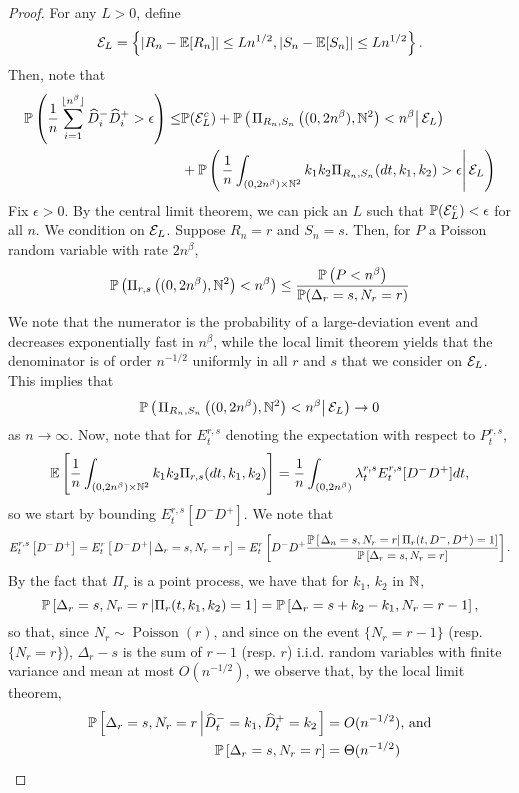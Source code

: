 \begin{proof}
For any $L>0$, define
$$\cE_L=\left\{|R_n-\E[R_n]|\leq Ln^{1/2},  |S_n-\E[S_n]|\leq Ln^{1/2}\right\}.$$
Then, note that 
\begin{align*}\P\left(\frac{1}{n}\sum_{i=1}^{\lfloor n^\beta\rfloor} \widehat{D}_i^-\widehat{D}_i^+>\epsilon \right)\leq & \P(\cE_L^c) + \P\left(\left.\Pi_{R_n,S_n}\left((0,2n^\beta),\N^2\right)<n^\beta\right|\cE_L \right)\\
&+\P\left(\left.\frac{1}{n}\int_{(0,2n^\beta)\times \N^2}k_1k_2 \Pi_{R_n,S_n}(dt,k_1,k_2)>\epsilon  \right|\cE_L \right)\end{align*}
Fix $\epsilon>0$. By the central limit theorem, we can pick an $L$ such that $\P(\cE_L^c)<\epsilon$ for all $n$. We condition on $\cE_L$. Suppose $R_n=r$ and $S_n=s$. Then, for $P$ a Poisson random variable with rate $2n^\beta$,
 $$\P\left(\Pi_{r,s}\left((0,2n^\beta),\N^2\right)<n^\beta\right)\leq \frac{\P\left(P<n^\beta\right)}{\P(\Delta_r=s, N_r=r)}$$
 We note that the numerator is the probability of a large-deviation event and decreases exponentially fast in $n^\beta$, while the local limit theorem yields that the denominator is of order $n^{-1/2}$ uniformly in all $r$ and $s$ that we consider on $\cE_L$. This implies that $$\P\left(\left.\Pi_{R_n,S_n}\left((0,2n^\beta),\N^2\right)<n^\beta\right|\cE_L\right)\to 0$$
as $n\to \infty$.  
Now, note that for $E^{r,s}_t$ denoting the expectation with respect to $P_t^{r,s}$,
$$\E\left[\frac{1}{n}\int_{(0,2n^\beta)\times \N^2}k_1k_2 \Pi_{r,s}(dt,k_1,k_2) \right]=\frac{1}{n}\int_{(0,2n^\beta)}\lambda^{r,s}_t E^{r,s}_t[D^- D^+]dt,$$
so we start by bounding $E^{r,s}_t[D^- D^+]$. 
We note that
$$E^{r,s}_t\left[{D}^-{D}^+\right]={E}^r_t\left[\left.{D}^-{D}^+\right| \Delta_r=s, N_r=r\right]={E}^r_t\left[{D}^-{D}^+\frac{\P\left[\left. \Delta_n=s, N_r=r \right|\Pi_r(t,D^-,D^+)=1\right]}{\P\left[ \Delta_r=s, N_r=r\right]}\right].$$
By the fact that $\Pi_r$ is a point process, we have that for $k_1$, $k_2$ in $\N$, 
$$\P\left[ \Delta_r=s, N_r=r \left| \Pi_r(t,k_1,k_2)=1\right.\right]=\P\left[ \Delta_r=s+k_2-k_1, N_r=r-1 \right],$$
so that, since $N_r\sim \operatorname{Poisson}(r)$, and since on the event $\{N_r=r-1\}$ (resp. $\{N_r=r\}$),  $\Delta_r-s$ is the sum of $r-1$ (resp. $r$) i.i.d. random variables with finite variance and mean at most $O(n^{-1/2})$, we observe that, by the local limit theorem,
\begin{align*}
    \P\left[ \Delta_r=s, N_r=r \left| \widehat{D}^-_t=k_1,\widehat{D}^+_t=k_2\right.\right]&=O(n^{-1/2})\text{, and}\\
    \P\left[ \Delta_r=s, N_r=r \right]&=\Theta(n^{-1/2})

\end{align*}
\end{proof}
